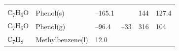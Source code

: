 \documentclass[
  9pt,
]{extbook}
\theoremstyle{definition}
\theoremstyle{definition}
\theoremstyle{definition}
\theoremstyle{remark}
\begin{document}
\begin{longtable}[]{@{}llllll@{}}
\begin{minipage}[t]{0.14\columnwidth}
\strut
\end{minipage}\tabularnewline
\begin{minipage}[t]{0.07\columnwidth}\raggedright
C\textsubscript{7}H\textsubscript{6}O\strut
\end{minipage} & \begin{minipage}[t]{0.17\columnwidth}\raggedright
Phenol(s)\strut
\end{minipage} & \begin{minipage}[t]{0.15\columnwidth}\raggedright
--165.1\strut
\end{minipage} & \begin{minipage}[t]{0.15\columnwidth}\raggedright
\strut
\end{minipage} & \begin{minipage}[t]{0.14\columnwidth}\raggedright
144\strut
\end{minipage} & \begin{minipage}[t]{0.14\columnwidth}\raggedright
127.4\strut
\end{minipage}\tabularnewline
\begin{minipage}[t]{0.07\columnwidth}\raggedright
C\textsubscript{7}H\textsubscript{6}O\strut
\end{minipage} & \begin{minipage}[t]{0.17\columnwidth}\raggedright
Phenol(g)\strut
\end{minipage} & \begin{minipage}[t]{0.15\columnwidth}\raggedright
--96.4\strut
\end{minipage} & \begin{minipage}[t]{0.15\columnwidth}\raggedright
--33\strut
\end{minipage} & \begin{minipage}[t]{0.14\columnwidth}\raggedright
316\strut
\end{minipage} & \begin{minipage}[t]{0.14\columnwidth}\raggedright
104\strut
\end{minipage}\tabularnewline
\begin{minipage}[t]{0.07\columnwidth}\raggedright
C\textsubscript{7}H\textsubscript{8}\strut
\end{minipage} & \begin{minipage}[t]{0.17\columnwidth}\raggedright
Methylbenzene(l)\strut
\end{minipage} & \begin{minipage}[t]{0.15\columnwidth}\raggedright
12.0\strut
\end{minipage} & \begin{minipage}[t]{0.15\columnwidth}\raggedright

\end{minipage}
\end{longtable}
\end{document}
